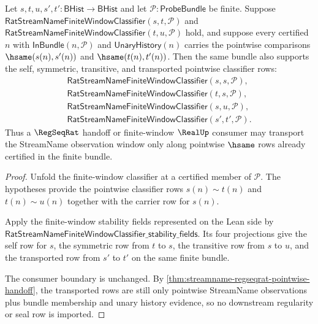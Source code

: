 \begin{theorem}
\label{thm:streamname-regseqrat-observation-stability}
Let $s,t,u,s',t':\mathsf{BHist}\to\mathsf{BHist}$ and let
$\mathcal{P}:\mathsf{ProbeBundle}$ be finite. Suppose
$\mathsf{RatStreamNameFiniteWindowClassifier}(s,t,\mathcal{P})$ and
$\mathsf{RatStreamNameFiniteWindowClassifier}(t,u,\mathcal{P})$ hold, and
suppose every certified $n$ with
$\mathsf{InBundle}(n,\mathcal{P})$ and $\mathsf{UnaryHistory}(n)$ carries the
pointwise comparisons $\hsame(s(n),s'(n))$ and $\hsame(t(n),t'(n))$. Then the
same bundle also supports the self, symmetric, transitive, and transported
pointwise classifier rows:
$$
\begin{gathered}
\mathsf{RatStreamNameFiniteWindowClassifier}(s,s,\mathcal{P}),\\
\mathsf{RatStreamNameFiniteWindowClassifier}(t,s,\mathcal{P}),\\
\mathsf{RatStreamNameFiniteWindowClassifier}(s,u,\mathcal{P}),\\
\mathsf{RatStreamNameFiniteWindowClassifier}(s',t',\mathcal{P}).
\end{gathered}
$$
Thus a $\RegSeqRat$ handoff or finite-window $\RealUp$ consumer may transport
the StreamName observation window only along pointwise $\hsame$ rows already
certified in the finite bundle.
\end{theorem}
\begin{proof}
Unfold the finite-window classifier at a certified member of
$\mathcal{P}$. The hypotheses provide the pointwise classifier rows
$s(n)\sim t(n)$ and $t(n)\sim u(n)$ together with the carrier row for $s(n)$.

Apply the finite-window stability fields represented on the Lean side by
$\mathsf{RatStreamNameFiniteWindowClassifier\_stability\_fields}$. Its four
projections give the self row for $s$, the symmetric row from $t$ to $s$, the
transitive row from $s$ to $u$, and the transported row from $s'$ to $t'$ on
the same finite bundle.

The consumer boundary is unchanged. By
\autoref{thm:streamname-regseqrat-pointwise-handoff}, the transported rows are
still only pointwise StreamName observations plus bundle membership and unary
history evidence, so no downstream regularity or seal row is imported.
\end{proof}


